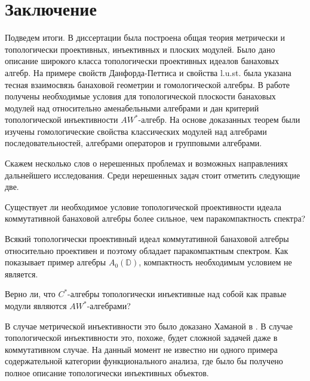 \chapter*{Заключение}						%

Подведем итоги. В диссертации была построена общая теория метрически и топологически проективных, инъективных и плоских модулей. Было дано описание широкого класса топологически проективных идеалов банаховых алгебр. На примере свойств Данфорда-Петтиса и свойства l.u.st. была указана тесная взаимосвязь банаховой геометрии и гомологической алгебры. В работе получены необходимые условия для топологической плоскости банаховых модулей над относительно аменабельными алгебрами и дан критерий топологической инъективности $AW^*$-алгебр. На основе доказанных теорем были изучены гомологические свойства классических модулей над алгебрами последовательностей, алгебрами операторов и групповыми алгебрами.

Скажем несколько слов о нерешенных проблемах и возможных направлениях дальнейшего исследования. Среди нерешенных задач стоит отметить следующие две.

\begin{problem*} Существует ли необходимое условие топологической проективности  идеала коммутативной банаховой алгебры более сильное, чем паракомпактность спектра?
\end{problem*}

Всякий топологически проективный идеал коммутативной банаховой алгебры относительно проективен и поэтому обладает паракомпактным спектром. Как показывает пример алгебры $A_0(\mathbb{D})$, компактность необходимым условием не является.

\begin{problem*} Верно ли, что $C^*$-алгебры топологически инъективные над собой как правые модули являются $AW^*$-алгебрами?
\end{problem*}

В случае метрической инъективности это было доказано Хаманой в \cite{HamInjEnvBanMod}. В случае топологической инъективности это, похоже, будет сложной задачей даже в коммутативном случае. На данный момент не известно ни одного примера содержательной категории функционального анализа, где было бы получено полное описание топологически инъективных объектов.

